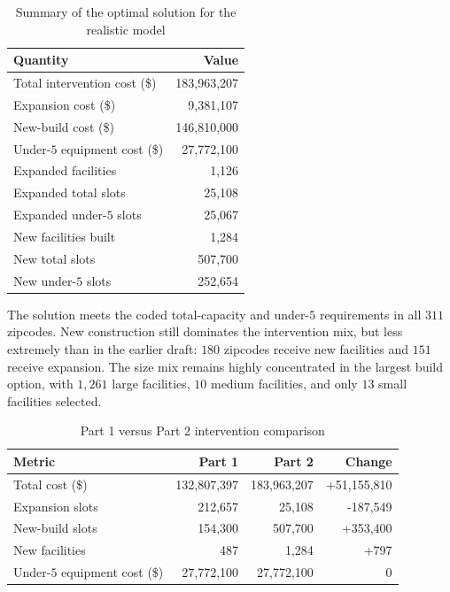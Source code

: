 \documentclass[11pt]{article}
\newcommand{\1}{\mathbb{I}}
\begin{document}
\begin{table}[H]
\centering
\small
\begin{tabular}{lr}
\toprule
\textbf{Quantity} & \textbf{Value} \\
\midrule
Total intervention cost (\$) & 183,963,207 \\
Expansion cost (\$) & 9,381,107 \\
New-build cost (\$) & 146,810,000 \\
Under-\(5\) equipment cost (\$) & 27,772,100 \\
Expanded facilities & 1,126 \\
Expanded total slots & 25,108 \\
Expanded under-\(5\) slots & 25,067 \\
New facilities built & 1,284 \\
New total slots & 507,700 \\
New under-\(5\) slots & 252,654 \\
\bottomrule
\end{tabular}
\caption{Summary of the optimal solution for the realistic model}
\end{table}

The solution meets the coded total-capacity and under-\(5\) requirements in all \(311\) zipcodes. New construction still dominates the intervention mix, but less extremely than in the earlier draft: \(180\) zipcodes receive new facilities and \(151\) receive expansion. The size mix remains highly concentrated in the largest build option, with \(1{,}261\) large facilities, \(10\) medium facilities, and only \(13\) small facilities selected.

\begin{table}[H]
\centering
\small
\begin{tabular}{lrrr}
\toprule
\textbf{Metric} & \textbf{Part 1} & \textbf{Part 2} & \textbf{Change} \\
\midrule
Total cost (\$) & 132,807,397 & 183,963,207 & +51,155,810 \\
Expansion slots & 212,657 & 25,108 & -187,549 \\
New-build slots & 154,300 & 507,700 & +353,400 \\
New facilities & 487 & 1,284 & +797 \\
Under-\(5\) equipment cost (\$) & 27,772,100 & 27,772,100 & 0 \\
\bottomrule
\end{tabular}
\caption{Part 1 versus Part 2 intervention comparison}
\end{table}
\end{document}
